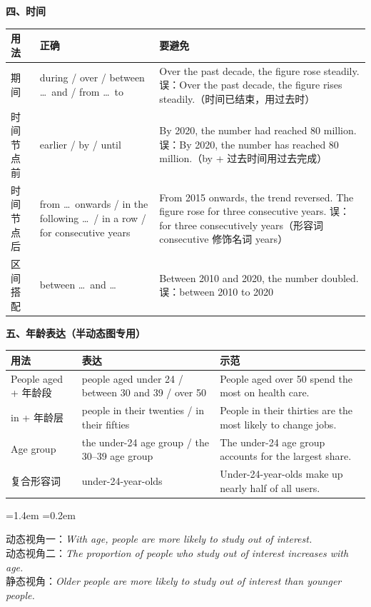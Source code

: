 \documentclass[11pt,a4paper]{ctexart}
\newcommand{\en}[1]{\textit{#1}}
\newenvironment{eg}{%
  \par\addvspace{4pt}%
  \begin{list}{}{\leftmargin=1.4em \rightmargin=0.2em \listparindent=0pt
    \itemindent=0pt \topsep=0pt \parsep=2pt \itemsep=2pt \partopsep=0pt}%
  \item\relax
}{%
  \end{list}\addvspace{5pt}%
}
\begin{document}
\par\addvspace{5pt}\noindent\textbf{四、时间}\par\addvspace{2pt}
\begin{longtable}{L{2.6cm}L{6.0cm}L{7.0cm}}
\toprule
\textbf{用法} & \textbf{正确} & \textbf{要避免} \\
\midrule
\endhead
期间 & during / over / between \ldots\ and / from \ldots\ to & Over the past decade, the figure rose steadily. 误：Over the past decade, the figure rises steadily.（时间已结束，用过去时） \\
时间节点前 & earlier / by / until & By 2020, the number had reached 80 million. 误：By 2020, the number has reached 80 million.（by + 过去时间用过去完成） \\
时间节点后 & from \ldots\ onwards / in the following \ldots\ / in a row / for consecutive years & From 2015 onwards, the trend reversed. The figure rose for three consecutive years. 误：for three consecutively years（形容词 consecutive 修饰名词 years） \\
区间搭配 & between \ldots\ and \ldots & Between 2010 and 2020, the number doubled. 误：between 2010 to 2020 \\
\bottomrule
\end{longtable}

\par\addvspace{5pt}\noindent\textbf{五、年龄表达（半动态图专用）}\par\addvspace{2pt}
\begin{longtable}{L{3.0cm}L{6.4cm}L{6.2cm}}
\toprule
\textbf{用法} & \textbf{表达} & \textbf{示范} \\
\midrule
\endhead
People aged + 年龄段 & people aged under 24 / between 30 and 39 / over 50 & People aged over 50 spend the most on health care. \\
in + 年龄层 & people in their twenties / in their fifties & People in their thirties are the most likely to change jobs. \\
Age group & the under-24 age group / the 30--39 age group & The under-24 age group accounts for the largest share. \\
复合形容词 & under-24-year-olds & Under-24-year-olds make up nearly half of all users. \\
\bottomrule
\end{longtable}

\begin{eg}
动态视角一：\en{With age, people are more likely to study out of interest.}\\
动态视角二：\en{The proportion of people who study out of interest increases with age.}\\
静态视角：\en{Older people are more likely to study out of interest than younger people.}\\
\end{eg}
\end{document}
